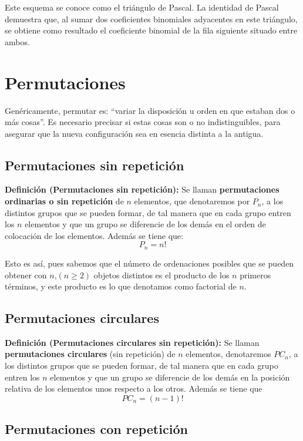 \documentclass[12pt]{article}
\theoremstyle{definition}
\theoremstyle{plain}
\theoremstyle{plain}
\theoremstyle{definition}
\begin{document}
            Este esquema se conoce como el triángulo de Pascal. La identidad de Pascal demuestra que, al sumar dos coeficientes binomiales adyacentes en este triángulo, se obtiene como resultado el coeficiente binomial de la fila siguiente situado entre ambos.

\section{Permutaciones}
    Genéricamente, permutar es: ``variar la disposición u orden en que estaban dos o más cosas”. Es necesario precisar si estas cosas son o no indistinguibles, para asegurar que la nueva configuración sea en esencia distinta a la antigua.

    \subsection{Permutaciones sin repetición}

        \textbf{Definición (Permutaciones sin repetición):}
        Se llaman \textbf{permutaciones ordinarias o sin repetición} de \(n\) elementos, que denotaremos por \(P_n\), a los distintos grupos que se pueden formar, de tal manera que en cada grupo entren los \(n\) elementos y que un grupo se diferencie de los demás en el orden de colocación de los elementos. Además se tiene que: $$P_n=n!$$ 
        
        Esto es así, pues sabemos que el número de ordenaciones posibles que se pueden obtener con \(n\),\((n \geq 2)\) objetos distintos es el producto de los \(n\) primeros términos, y este producto es lo que denotamos como factorial de \(n\).

    \subsection{Permutaciones circulares}
        \textbf{Definición (Permutaciones circulares sin repetición):}
        Se llaman \textbf{permutaciones circulares} (sin repetición) de \(n\) elementos, denotaremos \(PC_n\), a los distintos grupos que se pueden formar, de tal manera que en cada grupo entren los \(n\) elementos y que un grupo se diferencie de los demás en la posición relativa de los elementos unos respecto a los otros. Además se tiene que $$PC_n=(n-1)!$$

        
    \subsection{Permutaciones con repetición}
\end{document}
